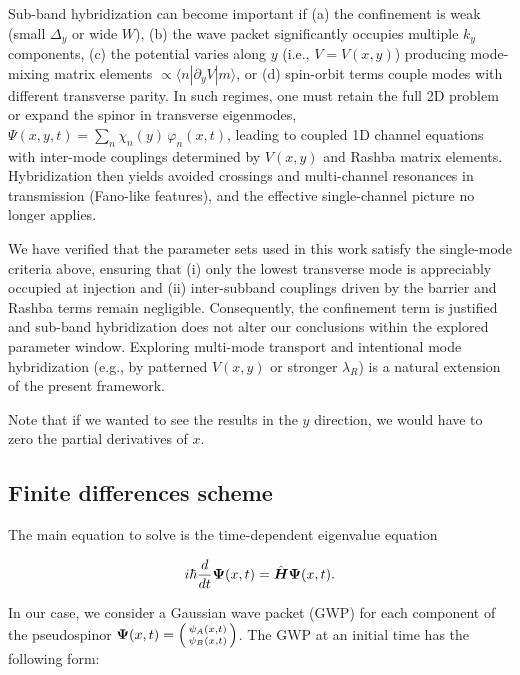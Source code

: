 Sub-band hybridization can become important if (a) the confinement is weak (small $\Delta_y$ or wide $W$), (b) the wave packet significantly occupies multiple $k_y$ components, (c) the potential varies along $y$ (i.e., $V=V(x,y)$) producing mode-mixing matrix elements $\propto\langle n|\partial_y V|m\rangle$, or (d) spin-orbit terms couple modes with different transverse parity.
In such regimes, one must retain the full 2D problem or expand the spinor in transverse eigenmodes,
$\Psi(x,y,t)=\sum_n \chi_n(y)\, \varphi_n(x,t)$,
leading to coupled 1D channel equations with inter-mode couplings determined by $V(x,y)$ and Rashba matrix elements.
Hybridization then yields avoided crossings and multi-channel resonances in transmission (Fano-like features), and the effective single-channel picture no longer applies\cite{Miroshnichenko2010}.

We have verified that the parameter sets used in this work satisfy the single-mode criteria above, ensuring that (i) only the lowest transverse mode is appreciably occupied at injection and (ii) inter-subband couplings driven by the barrier and Rashba terms remain negligible.
Consequently, the confinement term is justified and sub-band hybridization does not alter our conclusions within the explored parameter window.
Exploring multi-mode transport and intentional mode hybridization (e.g., by patterned $V(x,y)$ or stronger $\lambda_R$) is a natural extension of the present framework.

Note that if we wanted to see the results in the $y$ direction, we would have to zero the partial derivatives of $x$.

\subsection{Finite differences scheme}\label{subsec:finite-differences-scheme}

The main equation to solve is the time-dependent eigenvalue equation

\begin{equation}
    \label{eq:schrodingerTimeDependent}
    i\hbar \frac{d}{dt}\mbox{\boldmath $\Psi$}(x,t) = \hat{\mbox{\boldmath $H$}}\mbox{\boldmath $\Psi$}(x,t).
\end{equation}

In our case, we consider a Gaussian wave packet (GWP) for each component of the pseudospinor $\bn{\Psi}(x,t)=\begin{psmallmatrix*}
\psi_A(x,t)\\\psi_B(x,t)
\end{psmallmatrix*}$.
The GWP at an initial time has the following form:

